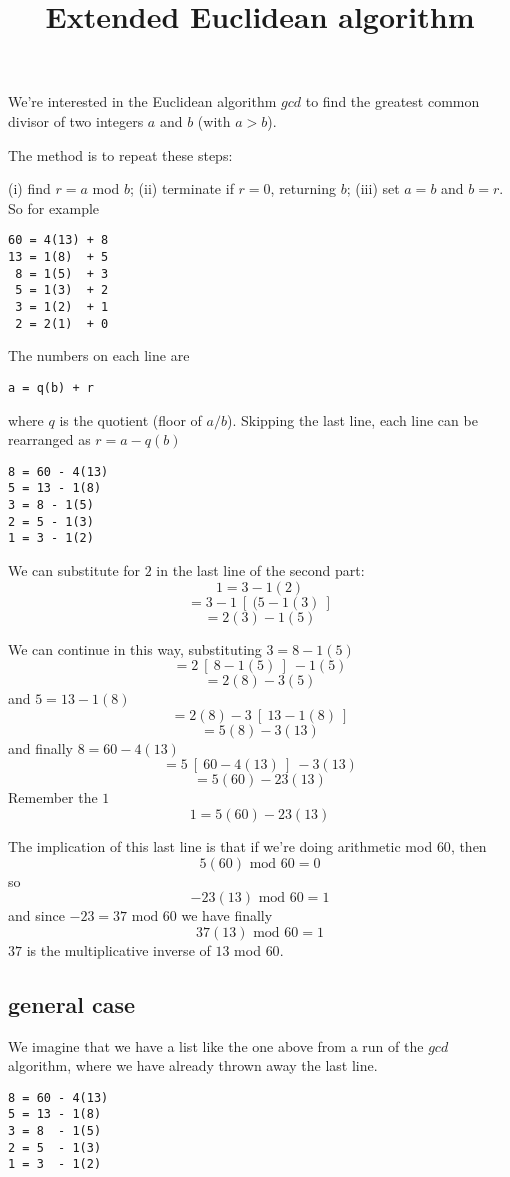 \documentclass[11pt, oneside]{article}   	%
\title{Extended Euclidean algorithm}
\date{}							%
\begin{document}
\maketitle
\Large

We're interested in the Euclidean algorithm $gcd$ to find the greatest common divisor of two integers $a$ and $b$ (with $a > b$).

The method is to repeat these steps:  

(i) find $r = a$ mod $b$;  (ii) terminate if $r = 0$, returning $b$;  (iii) set $a = b$ and $b = r$.  So for example
\begin{verbatim}
60 = 4(13) + 8
13 = 1(8)  + 5
 8 = 1(5)  + 3
 5 = 1(3)  + 2
 3 = 1(2)  + 1
 2 = 2(1)  + 0
\end{verbatim}
The numbers on each line are

\begin{verbatim}
a = q(b) + r 
\end{verbatim}
where $q$ is the quotient (floor of $a/b$).  Skipping the last line, each line can be rearranged as $r = a - q(b)$

\begin{verbatim}
8 = 60 - 4(13)
5 = 13 - 1(8)
3 = 8 - 1(5)
2 = 5 - 1(3)
1 = 3 - 1(2)
\end{verbatim}

We can substitute for $2$ in the last line of the second part:
\[ 1 = 3 - 1(2) \]
\[ = 3 - 1 \ [ \ (5 - 1(3) \ ] \]
\[ = 2(3) - 1(5) \]

We can continue in this way, substituting $3 = 8 - 1(5)$
\[ = 2 \ [ \ 8 - 1(5) \ ] \ - 1(5) \]
\[ = 2(8) - 3(5) \]
and $5 = 13 - 1(8)$
\[ = 2(8) - 3 \ [ \ 13 - 1(8) \ ] \]
\[ = 5(8) - 3(13) \]
and finally $8 = 60 - 4(13)$
\[ = 5 \ [ \ 60 - 4(13) \ ] \ - 3(13) \]
\[ = 5(60) - 23(13) \]
Remember the $1$
\[ 1 = 5(60) - 23(13) \]

The implication of this last line is that if we're doing arithmetic mod $60$, then
\[ 5(60)  \text{ mod } 60 = 0 \]
so
\[ - 23(13)  \text{ mod } 60 = 1 \]
and since $-23 = 37  \text{ mod } 60$ we have finally
\[ 37(13)  \text{ mod } 60 = 1 \]
$37$ is the multiplicative inverse of $13$ mod $60$.

\subsection*{general case}

We imagine that we have a list like the one above from a run of the $gcd$ algorithm, where we have already thrown away the last line.
\begin{verbatim}
8 = 60 - 4(13)
5 = 13 - 1(8)
3 = 8  - 1(5)
2 = 5  - 1(3)
1 = 3  - 1(2)
\end{verbatim}
\end{document}
